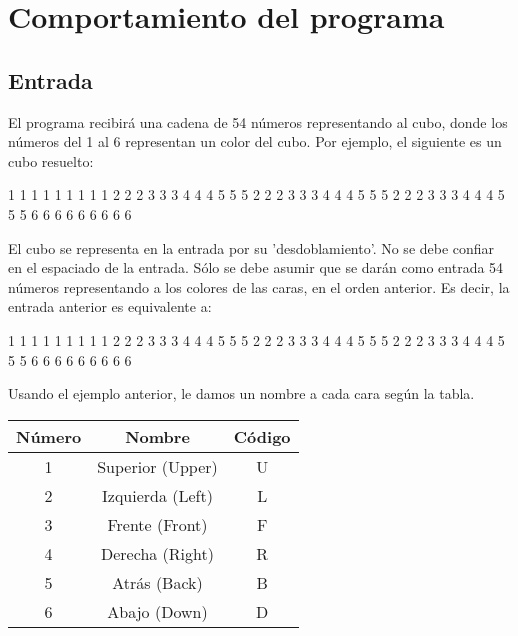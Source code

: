 \documentclass[11pt,a4paper]{article}
\begin{document}
\section{Comportamiento del programa}

\subsection{Entrada}
El programa recibirá una cadena de 54 números representando al cubo, donde los números del 1 al 6 representan un color del cubo. Por ejemplo, el siguiente es un cubo resuelto: \\
\begin{center}
\begin{verbbox}
      1 1 1 
      1 1 1 
      1 1 1 
2 2 2 3 3 3 4 4 4 5 5 5 
2 2 2 3 3 3 4 4 4 5 5 5 
2 2 2 3 3 3 4 4 4 5 5 5
      6 6 6 
      6 6 6 
      6 6 6 
\end{verbbox}

\theverbbox
\end{center}

El cubo se representa en la entrada por su 'desdoblamiento'. No se debe confiar en el espaciado de la entrada. Sólo se debe asumir que se darán como entrada 54 números representando a los colores de las caras, en el orden anterior. Es decir, la entrada anterior es equivalente a:

\begin{center}
\begin{verbbox}
1 1 1 1 1 1 1 1 1 2 2 2 3 3 3 4 4 4 5 5 5 2 2 2 3 3 3
4 4 4 5 5 5 2 2 2 3 3 3 4 4 4 5 5 5 6 6 6 6 6 6 6 6 6 
\end{verbbox}

\theverbbox
\end{center}

Usando el ejemplo anterior, le damos un nombre a cada cara según la tabla. \\

\begin{center}
\begin{tabular}{| c || c | c |}
\hline 
Número & Nombre & Código \\ \hline
1 & Superior (Upper) & U \\ \hline
2 & Izquierda (Left) & L \\ \hline
3 & Frente (Front) & F \\ \hline
4 & Derecha (Right) & R \\ \hline
5 & Atrás (Back) & B \\ \hline
6 & Abajo (Down) & D \\ \hline
\end{tabular}
\end{center}
\end{document}
